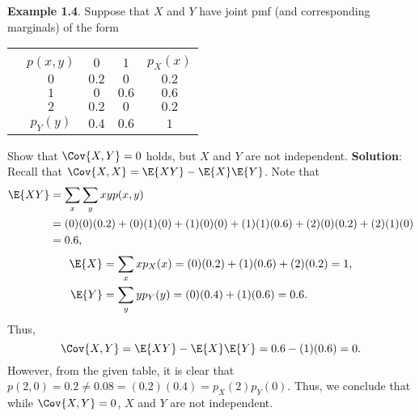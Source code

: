 \begin{Example}
    \textbf{Example 1.4}. Suppose that $ X $ and $ Y $ have joint pmf (and corresponding marginals) of the form
    \begin{center}
        \begin{NiceTabular}{cc|cc|c}
                               &                                   \\%
                               & $ p(x,y) $       & $ 0 $   & $ 1 $   & $ p_X(x) $ \\
             & $ 0 $            & $ 0.2 $ & $ 0 $   & $ 0.2 $    \\%
                               & $ 1 $            & $ 0 $   & $ 0.6 $ & $ 0.6 $    \\
                               & $ 2 $            & $ 0.2 $ & $ 0 $   & $ 0.2 $    \\
                               & $ p_Y(y) $       & $ 0.4 $ & $ 0.6 $ & $ 1 $
        \end{NiceTabular}
    \end{center}
    Show that $ \Cov{X,Y}=0 $ holds, but $ X $ and $ Y $ are not independent.
    \tcblower{}
    \textbf{Solution}: Recall that $ \Cov{X,X}=\E{XY}-\E{X}\E{Y} $. Note that
    \begin{align*}
        \E{XY}
         & =\sum_x\sum_y xyp(x,y)                                             \\
         & =(0)(0)(0.2)+(0)(1)(0)+(1)(0)(0)+(1)(1)(0.6)+(2)(0)(0.2)+(2)(1)(0) \\
         & =0.6,
    \end{align*}
    \begin{align*}
        \E{X} & =\sum_x x p_X(x)=(0)(0.2)+(1)(0.6)+(2)(0.2)=1, \\
        \E{Y} & =\sum_y y p_Y(y)=(0)(0.4)+(1)(0.6)=0.6.
    \end{align*}
    Thus,
    \[ \Cov{X,Y}=\E{XY}-\E{X}\E{Y}=0.6-(1)(0.6)=0. \]
    However, from the given table, it is clear that $ p(2,0)=0.2\ne 0.08=(0.2)(0.4)=p_X(2)p_Y(0) $. Thus, we
    conclude that while $ \Cov{X,Y}=0 $, $ X $ and $ Y $ are not independent.
\end{Example}
